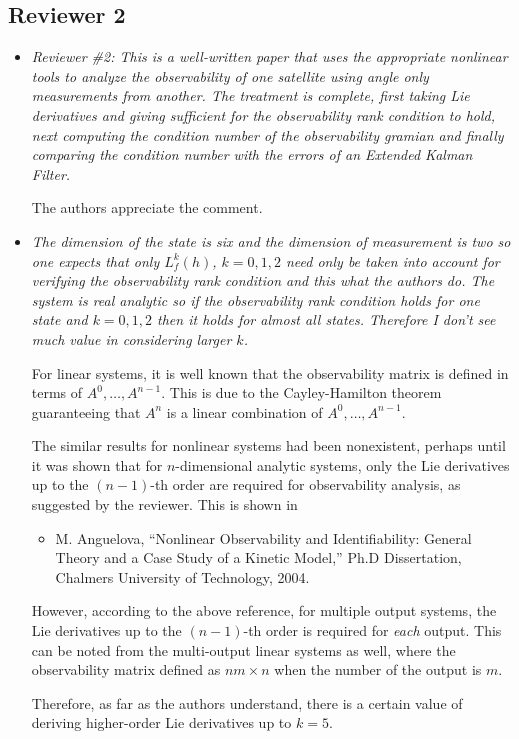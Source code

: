 \documentclass[11pt]{article}
\begin{document}
\subsection*{Reviewer 2}

\setlength{\leftmargini}{0pt}
\begin{itemize}\setlength{\itemsep}{2\parsep}

\item {\itshape Reviewer \#2: This is a well-written paper that uses the appropriate nonlinear tools to analyze the observability of one satellite
using angle only measurements from another.  The treatment is complete, first taking Lie derivatives and giving sufficient
for the observability rank condition to hold, next computing the condition number of the observability gramian and finally comparing
the condition number with the errors of an Extended Kalman Filter.}

The authors appreciate the comment.

\item {\itshape The dimension of the state is six and the dimension of measurement is two so one expects
that only $L^k_f(h)$, $k=0,1,2$ need only be taken into account for verifying the observability rank condition
and this what the authors do.  The system is real analytic so if the observability rank condition holds for one state
and $k=0,1,2$ then it holds for almost all states.  Therefore I don't see much value in considering larger $k$.}

For linear systems, it is well known that the observability matrix is defined in terms of $A^0,\ldots, A^{n-1}$. This is due to the Cayley-Hamilton theorem guaranteeing that $A^n$ is a linear combination of $A^0,\ldots, A^{n-1}$.

The similar results for nonlinear systems had been nonexistent, perhaps until it was shown that for  $n$-dimensional analytic systems, only the Lie derivatives up to the $(n-1)$-th order are required for observability analysis, as suggested by the reviewer. This is shown in

\begin{itemize}
\item[] M. Anguelova, ``Nonlinear Observability and Identifiability: General Theory and a Case Study of a Kinetic Model,'' Ph.D Dissertation, Chalmers University of Technology, 2004.
\end{itemize}

However, according to the above reference, for multiple output systems, the Lie derivatives up to the $(n-1)$-th order is required for \textit{each} output. This can be noted from the multi-output linear systems as well, where the observability matrix defined as $nm\times n$ when the number of the output is $m$.

Therefore, as far as the authors understand, there is a certain value of deriving higher-order Lie derivatives up to $k=5$. 


\end{itemize}
\end{document}
